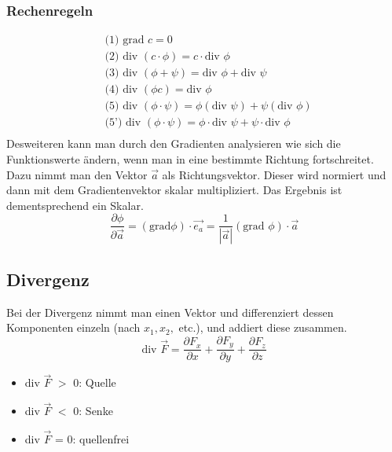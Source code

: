 \documentclass[a4paper,10pt]{scrartcl}
\begin{document}
        \subsubsection*{Rechenregeln}
        \begin{equation*}
            \begin{aligned}
                & \text{(1) } \text{grad } c = 0 \\
                & \text{(2) } \text{div } (c \cdot \phi) = c \cdot \text{div }\phi \\
                & \text{(3) } \text{div } (\phi + \psi) = \text{div } \phi + \text{div } \psi \\
                & \text{(4) } \text{div } (\phi c) = \text{div } \phi \\
                & \text{(5) } \text{div } (\phi \cdot \psi)= \phi(\text{div } \psi) + \psi(\text{div } \phi) \\
                & \text{(5') } \text{div } (\phi \cdot \psi)= \phi \cdot \text{div } \psi + \psi \cdot \text{div } \phi \\
            \end{aligned}
        \end{equation*}
        Desweiteren kann man durch den Gradienten analysieren wie sich die Funktionswerte ändern, wenn man in eine bestimmte Richtung fortschreitet. Dazu nimmt man den
        Vektor \(\vec{a}\) als Richtungsvektor. Dieser wird normiert und dann mit dem Gradientenvektor skalar multipliziert. Das Ergebnis ist dementsprechend ein Skalar. 
        \begin{equation*}
            \frac{\partial \phi}{\partial \vec{a}} = (\text{grad}  \phi) \cdot \vec{e_a} = \frac{1}{|\vec{a}|} (\text{grad } \phi) \cdot \vec{a}
        \end{equation*}
        
        \subsection{Divergenz}
        Bei der Divergenz nimmt man einen Vektor und differenziert dessen Komponenten einzeln (nach \(x_1, x_2,\) etc.), und addiert diese zusammen. 
        \begin{equation*}
            \text{div } \vec{F} = \frac{\partial F_x}{\partial x} + \frac{\partial F_y}{\partial y} +\frac{\partial F_z}{\partial z}
        \end{equation*} 
        \begin{itemize}
            \item div \(\vec{F}\) \(>\) 0: Quelle
            \item div \(\vec{F}\) \(<\) 0: Senke
            \item div \(\vec{F}\) = 0: quellenfrei 
        \end{itemize}
\end{document}
